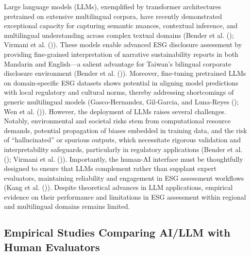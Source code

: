 \documentclass[
  12pt,
]{article}
\begin{document}
Large language models (LLMs), exemplified by transformer architectures
pretrained on extensive multilingual corpora, have recently demonstrated
exceptional capacity for capturing semantic nuances, contextual
inference, and multilingual understanding across complex textual domains
(Bender et al. (); Virmani et al.
()). These models enable advanced ESG
disclosure assessment by providing fine-grained interpretation of
narrative sustainability reports in both Mandarin and English---a
salient advantage for Taiwan's bilingual corporate disclosure
environment (Bender et al. ()). Moreover,
fine-tuning pretrained LLMs on domain-specific ESG datasets shows
potential in aligning model predictions with local regulatory and
cultural norms, thereby addressing shortcomings of generic multilingual
models (Gasco-Hernandez, Gil-Garcia, and Luna-Reyes
(); Wen et al.
()). However, the deployment of LLMs raises
several challenges. Notably, environmental and societal risks stem from
computational resource demands, potential propagation of biases embedded
in training data, and the risk of ``hallucinated'' or spurious outputs,
which necessitate rigorous validation and interpretability safeguards,
particularly in regulatory applications (Bender et al.
(); Virmani et al.
()). Importantly, the human-AI interface
must be thoughtfully designed to ensure that LLMs complement rather than
supplant expert evaluators, maintaining reliability and engagement in
ESG assessment workflows (Kang et al. ()).
Despite theoretical advances in LLM applications, empirical evidence on
their performance and limitations in ESG assessment within regional and
multilingual domains remains limited.

\subsection{Empirical Studies Comparing AI/LLM with Human
Evaluators}\label{empirical-studies-comparing-aillm-with-human-evaluators}
\end{document}
